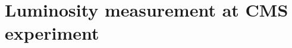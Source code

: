 \chapter{Luminosity measurement at CMS experiment}  %

\ifpdf
    \graphicspath{{Chapter2/Figs/Raster/}{Chapter2/Figs/PDF/}{Chapter2/Figs/}}
\else
    \graphicspath{{Chapter2/Figs/Vector/}{Chapter2/Figs/}}
\fi




